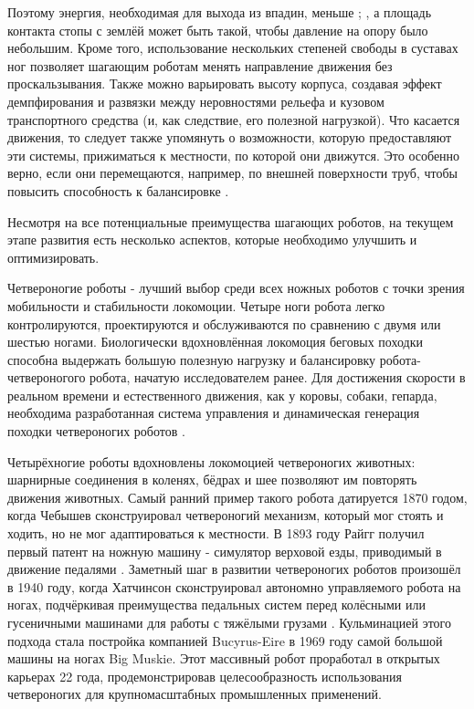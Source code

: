Поэтому энергия, необходимая для выхода из впадин, меньше \cite{Bekker1962}; \cite{bekker1969}, а площадь контакта стопы с землёй может быть такой, чтобы давление на опору было небольшим. Кроме того, использование нескольких степеней свободы в суставах ног позволяет шагающим роботам менять направление движения без проскальзывания. Также можно варьировать высоту корпуса, создавая эффект демпфирования и развязки между неровностями рельефа и кузовом транспортного средства (и, как следствие, его полезной нагрузкой). Что касается движения, то следует также упомянуть о возможности, которую предоставляют эти системы, прижиматься к местности, по которой они движутся. Это особенно верно, если они перемещаются, например, по внешней поверхности труб, чтобы повысить способность к балансировке \cite{Kaneko2002}.

Несмотря на все потенциальные преимущества шагающих роботов, на текущем этапе развития есть несколько аспектов, которые необходимо улучшить и оптимизировать.

Четвероногие роботы - лучший выбор среди всех ножных роботов с точки зрения мобильности и стабильности локомоции. Четыре ноги робота легко контролируются, проектируются и обслуживаются по сравнению с двумя или шестью ногами. Биологически вдохновлённая локомоция беговых походки способна выдержать большую полезную нагрузку и балансировку робота-четвероногого робота, начатую исследователем ранее. Для достижения скорости в реальном времени и естественного движения, как у коровы, собаки, гепарда, необходима разработанная система управления и динамическая генерация походки четвероногих роботов \cite{gonccalves2013}.

Четырёхногие роботы вдохновлены локомоцией четвероногих животных: шарнирные соединения в коленях, бёдрах и шее позволяют им повторять движения животных. Самый ранний пример такого робота датируется 1870 годом, когда Чебышев сконструировал четвероногий механизм, который мог стоять и ходить, но не мог адаптироваться к местности. В 1893 году Райгг получил первый патент на ножную машину - симулятор верховой езды, приводимый в движение педалями \cite{patent}. Заметный шаг в развитии четвероногих роботов произошёл в 1940 году, когда Хатчинсон сконструировал автономно управляемого робота на ногах, подчёркивая преимущества педальных систем перед колёсными или гусеничными машинами для работы с тяжёлыми грузами \cite{Hutchinson1967}.  Кульминацией этого подхода стала постройка компанией Bucyrus-Eire в 1969 году самой большой машины на ногах Big Muskie. Этот массивный робот проработал в открытых карьерах 22 года, продемонстрировав целесообразность использования четвероногих для крупномасштабных промышленных применений.

